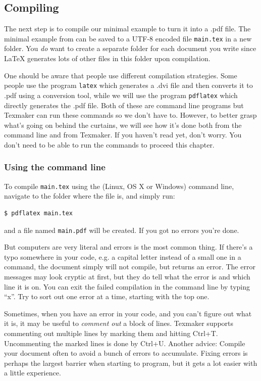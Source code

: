 \subsection{Compiling}
The next step is to compile our minimal example to turn it into a .pdf file. The minimal example from  can be saved to a UTF-8 encoded file \texttt{main.tex} in a new folder. You \emph{do} want to create a separate folder for each document you write since \LaTeX{} generates lots of other files in this folder upon compilation.

One should be aware that people use different compilation strategies. Some people use the program \texttt{latex} which generates a .dvi file and then converts it to .pdf using a conversion tool, while we will use the program \texttt{pdflatex} which directly generates the .pdf file. Both of these are command line programs but Texmaker can run these commands so we don't have to. However, to better grasp what's going on behind the curtains, we will see how it's done both from the command line and from Texmaker. If you haven't read  yet, don't worry. You don't need to be able to run the commands to proceed this chapter.

\subsubsection{Using the command line}
To compile \texttt{main.tex} using the (Linux, OS X or Windows) command line, navigate to the folder where the file is, and simply run:
\begin{verbatim}
$ pdflatex main.tex
\end{verbatim}
and a file named \verb|main.pdf| will be created. If you got no errors you're done.

But computers are very literal and errors is the most common thing. If there's a typo somewhere in your code, e.g. a capital letter instead of a small one in a command, the document simply will not compile, but returns an error. The error messages may look cryptic at first, but they do tell what the error is and which line it is on. You can exit the failed compilation in the command line by typing ``x''. Try to sort out one error at a time, starting with the top one.

Sometimes, when you have an error in your code, and you can't figure out what it is, it may be useful to \emph{comment out} a block of lines. Texmaker supports commenting out multiple lines by marking them and hitting Ctrl+T. Uncommenting the marked lines is done by Ctrl+U. Another advice: Compile your document often to avoid a bunch of errors to accumulate. Fixing errors is perhaps the largest barrier when starting to program, but it gets a lot easier with a little experience.

